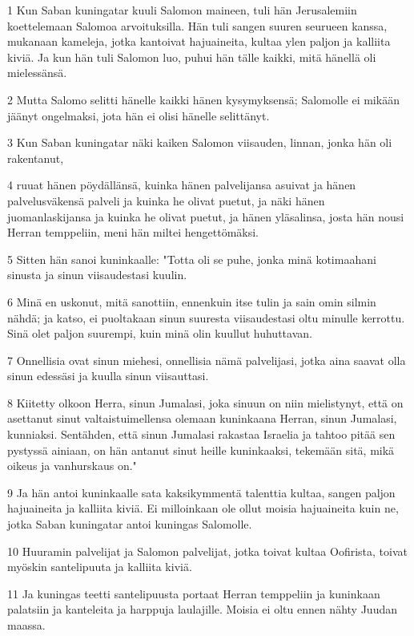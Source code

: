 \par 1 Kun Saban kuningatar kuuli Salomon maineen, tuli hän Jerusalemiin koettelemaan Salomoa arvoituksilla. Hän tuli sangen suuren seurueen kanssa, mukanaan kameleja, jotka kantoivat hajuaineita, kultaa ylen paljon ja kalliita kiviä. Ja kun hän tuli Salomon luo, puhui hän tälle kaikki, mitä hänellä oli mielessänsä.
\par 2 Mutta Salomo selitti hänelle kaikki hänen kysymyksensä; Salomolle ei mikään jäänyt ongelmaksi, jota hän ei olisi hänelle selittänyt.
\par 3 Kun Saban kuningatar näki kaiken Salomon viisauden, linnan, jonka hän oli rakentanut,
\par 4 ruuat hänen pöydällänsä, kuinka hänen palvelijansa asuivat ja hänen palvelusväkensä palveli ja kuinka he olivat puetut, ja näki hänen juomanlaskijansa ja kuinka he olivat puetut, ja hänen yläsalinsa, josta hän nousi Herran temppeliin, meni hän miltei hengettömäksi.
\par 5 Sitten hän sanoi kuninkaalle: "Totta oli se puhe, jonka minä kotimaahani sinusta ja sinun viisaudestasi kuulin.
\par 6 Minä en uskonut, mitä sanottiin, ennenkuin itse tulin ja sain omin silmin nähdä; ja katso, ei puoltakaan sinun suuresta viisaudestasi oltu minulle kerrottu. Sinä olet paljon suurempi, kuin minä olin kuullut huhuttavan.
\par 7 Onnellisia ovat sinun miehesi, onnellisia nämä palvelijasi, jotka aina saavat olla sinun edessäsi ja kuulla sinun viisauttasi.
\par 8 Kiitetty olkoon Herra, sinun Jumalasi, joka sinuun on niin mielistynyt, että on asettanut sinut valtaistuimellensa olemaan kuninkaana Herran, sinun Jumalasi, kunniaksi. Sentähden, että sinun Jumalasi rakastaa Israelia ja tahtoo pitää sen pystyssä ainiaan, on hän antanut sinut heille kuninkaaksi, tekemään sitä, mikä oikeus ja vanhurskaus on."
\par 9 Ja hän antoi kuninkaalle sata kaksikymmentä talenttia kultaa, sangen paljon hajuaineita ja kalliita kiviä. Ei milloinkaan ole ollut moisia hajuaineita kuin ne, jotka Saban kuningatar antoi kuningas Salomolle.
\par 10 Huuramin palvelijat ja Salomon palvelijat, jotka toivat kultaa Oofirista, toivat myöskin santelipuuta ja kalliita kiviä.
\par 11 Ja kuningas teetti santelipuusta portaat Herran temppeliin ja kuninkaan palatsiin ja kanteleita ja harppuja laulajille. Moisia ei oltu ennen nähty Juudan maassa.
